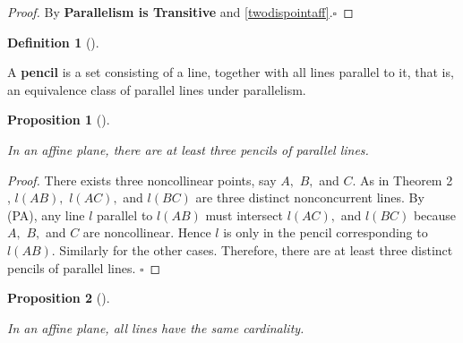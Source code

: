 \documentclass[
  twoside,
  12pt,
  letterpaper,
  fleqn]{article}
\theoremstyle{definition}
\newtheorem{definition}{Definition}[section]
\theoremstyle{definition}
\theoremstyle{plain}
\newtheorem{proposition}{Proposition}[section]
\theoremstyle{plain}
\theoremstyle{remark}
\begin{document}
\begin{proof}

By \textbf{Parallelism is Transitive} and
\eqref{twodispointaff}.\(\square\)

\end{proof}

\begin{definition}[]\protect\hypertarget{def-pencil}{}\label{def-pencil}

A \textbf{pencil} is a set consisting of a line, together with all lines
parallel to it, that is, an equivalence class of parallel lines under
parallelism.

\end{definition}

\begin{proposition}[]\protect\hypertarget{prp-five}{}\label{prp-five}

\label{threepencils} In an affine plane, there are at least three
pencils of parallel lines.

\end{proposition}

\begin{proof}

There exists three noncollinear points, say \(A,\) \(B,\) and \(C.\) As
in Theorem 2 , \(l(AB),\) \(l(AC),\) and \(l(BC)\) are three distinct
nonconcurrent lines. By (PA), any line \(l\) parallel to \(l(AB)\) must
intersect \(l(AC),\) and \(l(BC)\) because \(A,\) \(B,\) and \(C\) are
noncollinear. Hence \(l\) is only in the pencil corresponding to
\(l(AB).\) Similarly for the other cases. Therefore, there are at least
three distinct pencils of parallel lines. \(\square\)

\end{proof}

\begin{proposition}[]\protect\hypertarget{prp-bijection}{}\label{prp-bijection}

In an affine plane, all lines have the same cardinality.

\end{proposition}
\end{document}
